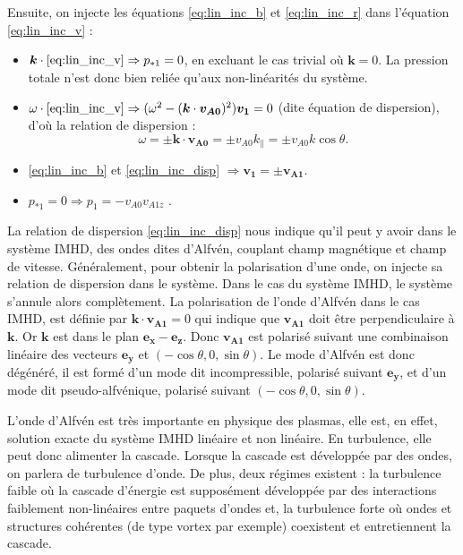 Ensuite, on injecte les équations \eqref{eq:lin_inc_b} et \eqref{eq:lin_inc_r} dans l'équation \eqref{eq:lin_inc_v} : 
\begin{itemize}
    \item $\boldsymbol{k} \cdot \eqref{eq:lin_inc_v} \Rightarrow  p_{*1} =0$, en excluant le cas trivial où $\boldsymbol{k}=0$. La pression totale n'est donc bien reliée qu'aux non-linéarités du système.
    \item $\omega \cdot \eqref{eq:lin_inc_v} \Rightarrow (\omega^2   - (\boldsymbol{k} \cdot \boldsymbol{v_{A0}})^2 ) \boldsymbol{v_{1}} = 0$ (dite équation de dispersion), d'où la relation de dispersion :  
    \begin{equation}
        \label{eq:lin_inc_disp} \omega = \pm \boldsymbol{k} \cdot \boldsymbol{v_{A0}} = \pm v_{A0} k_{\parallel} =  \pm v_{A0} k \cos \theta .
    \end{equation}
    \item \eqref{eq:lin_inc_b} et \eqref{eq:lin_inc_disp} $ \Rightarrow \boldsymbol{v_{1}} = \pm \boldsymbol{v_{A1}}$.
    \item $ p_{*1} =0 \Rightarrow p_{1} = - v_{A0} v_{A1z}$ .
\end{itemize}
La relation de dispersion \eqref{eq:lin_inc_disp} nous indique qu'il peut y avoir dans le système \acs{IMHD}, des ondes dites d'Alfvén, couplant champ magnétique et champ de vitesse. 
Généralement, pour obtenir la polarisation d'une onde, on injecte sa relation de dispersion dans le système. Dans le cas du système \acs{IMHD}, le système s'annule alors complètement. La polarisation de l'onde d'Alfvén dans le cas \acs{IMHD}, est définie par $\boldsymbol{k} \cdot \boldsymbol{v_{A1}}  = 0 $ qui indique que $\boldsymbol{v_{A1}} $ doit être perpendiculaire à $\boldsymbol{k}$. Or $\boldsymbol{k}$ est dans le plan $\boldsymbol{e_x}-\boldsymbol{e_z}$. Donc $\boldsymbol{v_{A1}} $ est polarisé suivant une combinaison linéaire des vecteurs $\boldsymbol{e_y}$ et $(-\cos \theta, 0, \sin \theta)$. Le mode d'Alfvén est donc dégénéré, il est formé d'un mode dit incompressible, polarisé suivant $\boldsymbol{e_y}$, et d'un mode dit pseudo-alfvénique, polarisé suivant $(-\cos \theta, 0, \sin \theta)$.

L'onde d'Alfvén est très importante en physique des plasmas, elle est, en effet, solution exacte du système \acs{IMHD} linéaire et non linéaire. En turbulence, elle peut donc alimenter la cascade. Lorsque la cascade est développée par des ondes, on parlera de turbulence d'onde. De plus, deux régimes existent :  la turbulence faible où la cascade d'énergie est supposément développée par des interactions faiblement non-linéaires entre paquets d'ondes et, la turbulence forte où ondes et structures cohérentes (de type vortex par exemple) coexistent et entretiennent la cascade. 

